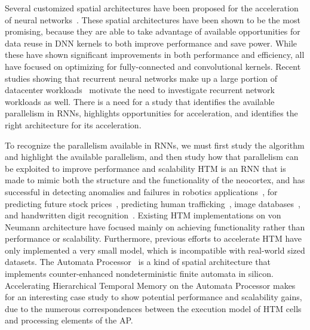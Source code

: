 Several customized spatial architectures have been proposed for the acceleration of neural networks~\cite{chen2017eyeriss, han2016eie}.
These spatial architectures have been shown to be the most promising, because they are able to take advantage of available opportunities for data reuse in DNN kernels to both improve performance and save power.
While these have shown significant improvements in both performance and efficiency, all have focused on optimizing for fully-connected and convolutional kernels.
Recent studies showing that recurrent neural networks make up a large portion of datacenter workloads~\cite{jouppi2017datacenter, dhawan2012fathom} motivate the need to investigate recurrent network workloads as well.
There is a need for a study that identifies the available parallelism in RNNs, highlights opportunities for acceleration, and identifies the right architecture for its acceleration.


To recognize the parallelism available in RNNs, we must first study the algorithm and highlight the available parallelism, and then study how that parallelism can be exploited to improve performance and scalability 
HTM is an RNN that is made to mimic both the structure and the functionality of the neocortex, and has successful in detecting anomalies and failures in robotics applications~\cite{walter2017spinnaker}, for predicting future stock prices~\cite{gabrielsson2012hierarchical}, predicting human trafficking~\cite{sinkevicius2011monitoring}, image databases~\cite{zhituo2012content}, and handwritten digit recognition~\cite{bobier2007handwritten}.
Existing HTM implementations on von Neumann architecture have focused mainly on achieving functionality rather than performance or scalability. 
Furthermore, previous efforts to accelerate HTM have only implemented a very small model, which is incompatible with real-world sized datasets.
The Automata Processor~\cite{dlugosch2014efficient} is a kind of spatial architecture that implements counter-enhanced nondeterministic finite automata in silicon.
Accelerating Hierarchical Temporal Memory on the Automata Processor makes for an interesting case study to show potential performance and scalability gains, due to the numerous correspondences between the execution model of HTM cells and processing elements of the AP.

